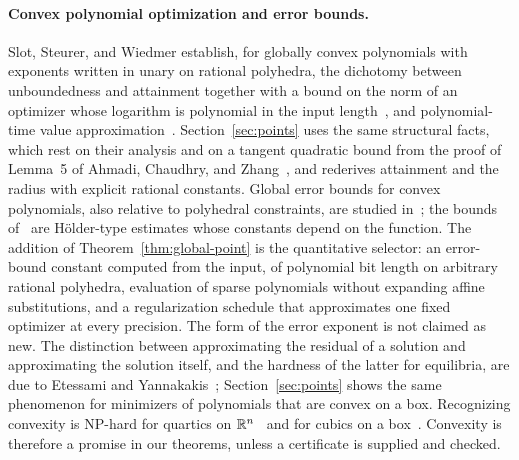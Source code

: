 \paragraph{Convex polynomial optimization and error bounds.}
Slot, Steurer, and Wiedmer establish, for globally convex polynomials with
exponents written in unary on rational polyhedra, the dichotomy between
unboundedness and attainment together with a bound on the norm of an
optimizer whose logarithm is polynomial in the input
length~\cite[Theorem~1.1]{SlotSteurerWiedmer2025}, and polynomial-time value
approximation~\cite[Corollary~1.2]{SlotSteurerWiedmer2025}.
Section~\ref{sec:points} uses the same structural facts, which rest on their
analysis and on a tangent quadratic bound from the proof of Lemma~5 of
Ahmadi, Chaudhry, and Zhang~\cite{AhmadiChaudhryZhang2024}, and rederives
attainment and the radius with explicit rational constants. Global error
bounds for convex polynomials, also relative to polyhedral constraints, are
studied in~\cite{Li2010,Li2013,Yang2009,Ngai2015}; the bounds
of~\cite{Li2010,Li2013,Ngai2015} are H\"older-type estimates whose constants
depend on the function. The addition of Theorem~\ref{thm:global-point} is
the quantitative selector: an error-bound constant computed from the input,
of polynomial bit length on arbitrary rational polyhedra, evaluation of
sparse polynomials without expanding affine substitutions, and a
regularization schedule that approximates one fixed optimizer at every
precision. The form of the error exponent is not claimed as new. The
distinction between approximating the residual of a solution and
approximating the solution itself, and the hardness of the latter for
equilibria, are due to Etessami and Yannakakis~\cite{EY2010};
Section~\ref{sec:points} shows the same phenomenon for minimizers of
polynomials that are convex on a box. Recognizing convexity is NP-hard for
quartics on $\mathbb R^n$~\cite{AhmadiOlshevskyParriloTsitsiklis2013} and for cubics
on a box~\cite{AhmadiHall2020}. Convexity is therefore a promise in our
theorems, unless a certificate is supplied and checked.

